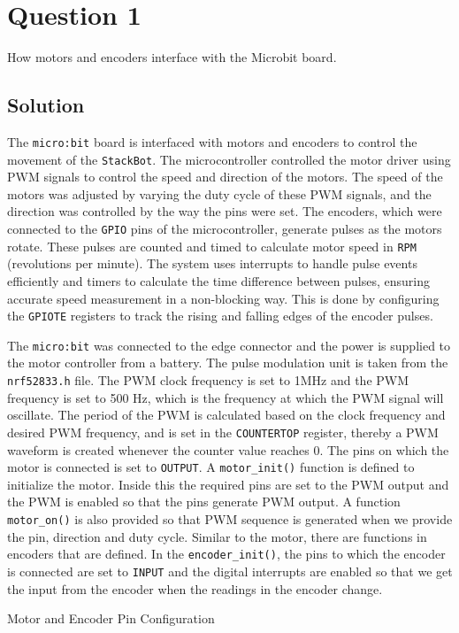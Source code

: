 \section*{Question 1}

How motors and encoders interface with the Microbit board.

\subsection*{Solution}

The \texttt{micro:bit} board is interfaced with motors and encoders to control the movement of the \texttt{StackBot}.
The microcontroller controlled the motor driver using PWM signals to control the speed and direction of the motors.
The speed of the motors was adjusted by varying the duty cycle of these PWM signals, and the direction was controlled by the way the pins were set.
The encoders, which were connected to the \texttt{GPIO} pins of the microcontroller, generate pulses as the motors rotate.
These pulses are counted and timed to calculate motor speed in \texttt{RPM} (revolutions per minute).
The system uses interrupts to handle pulse events efficiently and timers to calculate the time difference between pulses, ensuring accurate speed measurement in a non-blocking way.
This is done by configuring the \texttt{GPIOTE} registers to track the rising and falling edges of the encoder pulses.

The \texttt{micro:bit} was connected to the edge connector and the power is supplied to the motor controller from a battery.
The pulse modulation unit is taken from the \texttt{nrf52833.h} file.
The PWM clock frequency is set to 1MHz and the PWM frequency is set to 500 Hz, which is the frequency at which the PWM signal will oscillate.
The period of the PWM is calculated based on the clock frequency and desired PWM frequency, and is set in the \texttt{COUNTERTOP} register, thereby a PWM waveform is created whenever the counter value reaches 0.
The pins on which the motor is connected is set to \texttt{OUTPUT}.
A \texttt{motor\_init\@()} function is defined to initialize the motor.
Inside this the required pins are set to the PWM output and the PWM is enabled so that the pins generate PWM output.
A function \texttt{motor\_on\@()} is also provided so that PWM sequence is generated when we provide the pin, direction and duty cycle.
Similar to the motor, there are functions in encoders that are defined.
In the \texttt{encoder\_init\@()}, the pins to which the encoder is connected are set to \texttt{INPUT} and the digital interrupts are enabled so that we get the input from the encoder when the readings in the encoder change.

\begin{table}[h]
    \centering
    
    \caption{Motor and Encoder Pin Configuration
    }\label{tab:motorPinConfig}
\end{table}
